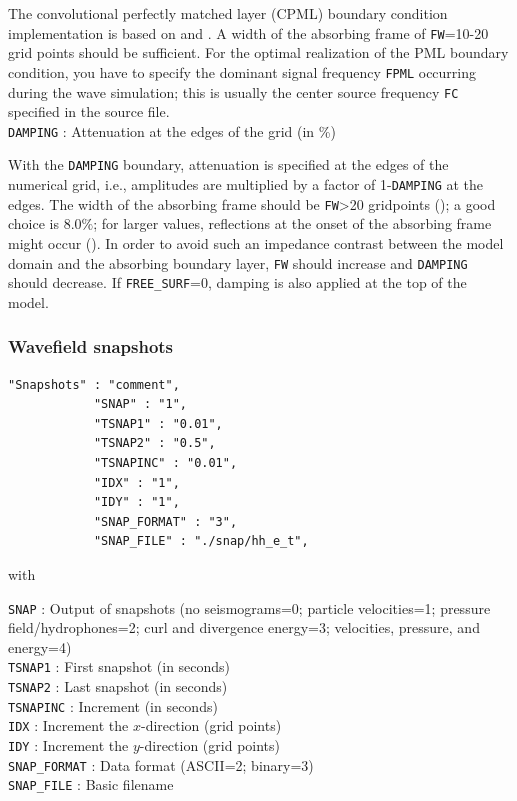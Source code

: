 The convolutional perfectly matched layer (CPML) boundary condition implementation is based on \citet{komatitsch:07} and \citet{martin:09}. A width of the absorbing frame of \texttt{FW}=10-20 grid points should be sufficient. For the optimal realization of the PML boundary condition, you have to specify the dominant signal frequency \texttt{FPML} occurring during the wave simulation; this is usually the center source frequency \texttt{FC} specified in the source file.\\

\texttt{DAMPING} : Attenuation at the edges of the grid (in \%)

With the \texttt{DAMPING} boundary, attenuation is specified at the edges of the numerical grid, i.e., amplitudes are multiplied by a factor of 1-\texttt{DAMPING} at the edges. The width of the absorbing frame should be \texttt{FW}>20 gridpoints (\cite{cerjan:85}); a good choice is 8.0$\%$; for larger values, reflections at the onset of the absorbing frame might occur (\cite{cerjan:85}). In order to avoid such an impedance contrast between the model domain and the absorbing boundary layer, \texttt{FW} should increase and \texttt{DAMPING} should decrease. If \texttt{FREE\_SURF}=0, damping is also applied at the top of the model.

\subsubsection{Wavefield snapshots}
\begin{verbatim}
"Snapshots" : "comment",
            "SNAP" : "1",
            "TSNAP1" : "0.01",
            "TSNAP2" : "0.5",
            "TSNAPINC" : "0.01",
            "IDX" : "1",
            "IDY" : "1",
            "SNAP_FORMAT" : "3",
            "SNAP_FILE" : "./snap/hh_e_t",
\end{verbatim}

with

\texttt{SNAP} : Output of snapshots (no seismograms=0; particle velocities=1; pressure field/hydrophones=2; curl and divergence energy=3; velocities, pressure, and energy=4)\\
\texttt{TSNAP1} : First snapshot (in seconds)\\
\texttt{TSNAP2} : Last snapshot (in seconds)\\
\texttt{TSNAPINC} : Increment (in seconds)\\
\texttt{IDX} : Increment the $x$-direction (grid points)\\
\texttt{IDY} : Increment the $y$-direction (grid points)\\
\texttt{SNAP\_FORMAT} : Data format (ASCII=2; binary=3)\\
\texttt{SNAP\_FILE} : Basic filename

